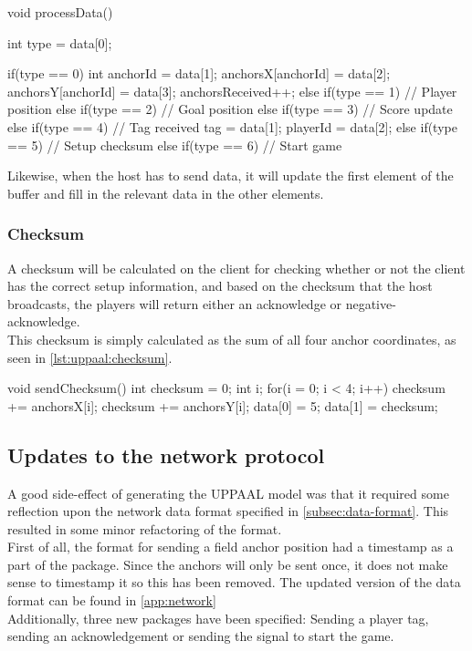 \begin{uppaalcode}[caption={Processing Data in UPPAAL model}, captionpos=b,label={lst:uppaal:processData}]
void processData(){
    int type = data[0];
    
    if(type == 0){
        int anchorId = data[1];
        anchorsX[anchorId] = data[2];
        anchorsY[anchorId] = data[3];
        anchorsReceived++;
    } else if(type == 1){
        // Player position
    } else if(type == 2){
        // Goal position
    } else if(type == 3){
        // Score update
    } else if(type == 4){
        // Tag received
        tag = data[1];
        playerId = data[2];
    } else if(type == 5){
        // Setup checksum
    } else if(type == 6){
        // Start game
    }
}
\end{uppaalcode}
\noindent
Likewise, when the host has to send data, it will update the first element of the buffer and fill in the relevant data in the other elements.

\subsubsection{Checksum}
A checksum will be calculated on the client for checking whether or not the client has the correct setup information, and based on the checksum that the host broadcasts, the players will return either an acknowledge or negative-acknowledge.
\\
This checksum is simply calculated as the sum of all four anchor coordinates, as seen in \autoref{lst:uppaal:checksum}.

\begin{uppaalcode}[caption={Calculating checksum in UPPAAL model}, captionpos=b,label={lst:uppaal:checksum}]
    void sendChecksum(){
        int checksum = 0;
        int i;
        for(i = 0; i < 4; i++){
            checksum += anchorsX[i];
            checksum += anchorsY[i];
        }
        data[0] = 5;
        data[1] = checksum;
    }
\end{uppaalcode}

\subsection{Updates to the network protocol}\label{subsec:sprint3networkupdate}
A good side-effect of generating the UPPAAL model was that it required some reflection upon the network data format specified in \autoref{subsec:data-format}.
This resulted in some minor refactoring of the format.
\\
First of all, the format for sending a field anchor position had a timestamp as a part of the package. 
Since the anchors will only be sent once, it does not make sense to timestamp it so this has been removed.
The updated version of the data format can be found in \autoref{app:network}
\\
Additionally, three new packages have been specified: Sending a player tag, sending an acknowledgement or sending the signal to start the game.


